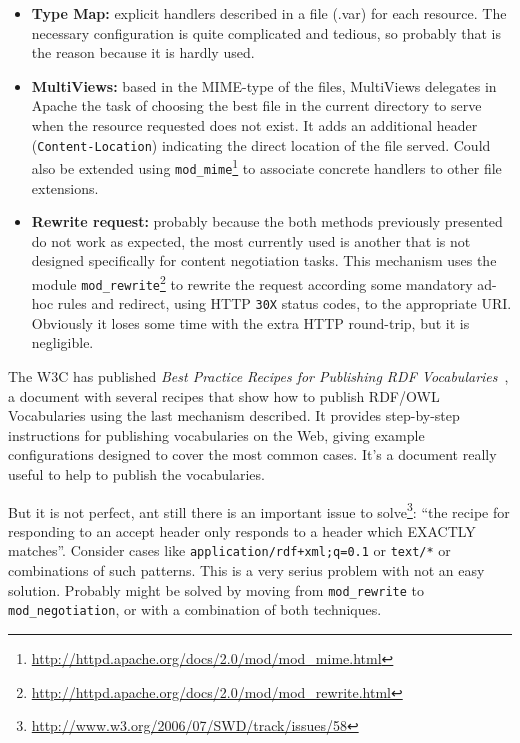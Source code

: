 \begin{itemize}

  \item \textbf{Type Map:} explicit handlers described in a file (.var) for each 
        resource. The necessary configuration is quite complicated and tedious, 
        so probably that is the reason because it is hardly used.

  \item \textbf{MultiViews:} based in the MIME-type of the files, MultiViews 
        delegates in Apache the task of choosing the best file in the current 
        directory to serve when the resource requested does not exist. It adds 
        an additional header (\texttt{Content-Location}) indicating the direct 
        location of the file served. Could also be extended using 
        \texttt{mod\_mime}\footnote{\url{http://httpd.apache.org/docs/2.0/mod/mod_mime.html}}
        to associate concrete handlers to other file extensions.

  \item \textbf{Rewrite request:} probably because the both methods previously 
        presented do not work as expected, the most currently used is another 
        that is not designed specifically for content negotiation tasks. This
        mechanism uses the module 
        \texttt{mod\_rewrite}\footnote{\url{http://httpd.apache.org/docs/2.0/mod/mod_rewrite.html}}
        to rewrite the request according some mandatory ad-hoc rules and redirect,
        using HTTP \texttt{30X} status codes, to the appropriate URI. Obviously it loses 
        some time with the extra HTTP round-trip, but it is negligible.

\end{itemize}


The W3C has published \textit{Best Practice Recipes for Publishing RDF Vocabularies}~\cite{Recipes},
a document with several recipes that show how to publish RDF/OWL Vocabularies using
the last mechanism described. It provides step-by-step instructions for publishing 
vocabularies on the Web, giving example configurations designed to cover the most 
common cases. It's a document really useful to help to publish the vocabularies.

But it is not perfect, ant still there is an important issue to 
solve\footnote{\url{http://www.w3.org/2006/07/SWD/track/issues/58}}: 
``the recipe for responding to an accept header only responds to a header which
EXACTLY matches''. Consider cases like \texttt{application/rdf+xml;q=0.1} or 
\texttt{text/*} or combinations of such patterns. This is a very serius problem
with not an easy solution. Probably might be solved by moving from \texttt{mod\_rewrite}
to \texttt{mod\_negotiation}, or with a combination of both techniques.

